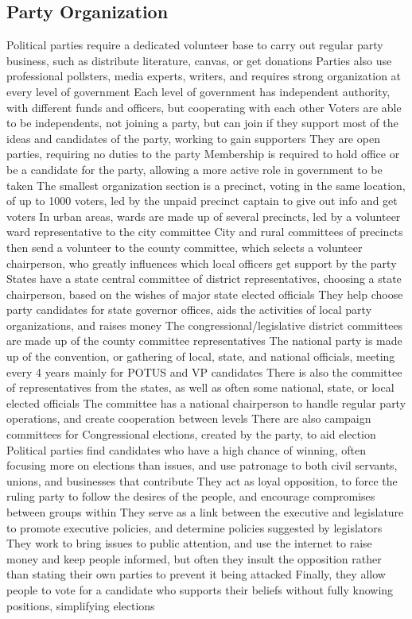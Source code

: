 \documentclass[11 pt, twoside]{article}
\newenvironment{outline*}
{
	\begin{outline}[enumerate]
	}
	{\end{outline}
}
\begin{document}
\subsection{Party Organization}
\begin{outline*}
\1 Political parties require a dedicated volunteer base to carry out regular party business, such as distribute literature, canvas, or get donations
\2 Parties also use professional pollsters, media experts, writers, and requires strong organization at every level of government
\2 Each level of government has independent authority, with different funds and officers, but cooperating with each other
\1 Voters are able to be independents, not joining a party, but can join if they support most of the ideas and candidates of the party, working to gain supporters
\2 They are open parties, requiring no duties to the party
\2 Membership is required to hold office or be a candidate for the party, allowing a more active role in government to be taken
\1 The smallest organization section is a precinct, voting in the same location, of up to 1000 voters, led by the unpaid precinct captain to give out info and get voters
\2 In urban areas, wards are made up of several precincts, led by a volunteer ward representative to the city committee
\2 City and rural committees of precincts then send a volunteer to the county committee, which selects a volunteer chairperson, who greatly influences which local officers get support by the party
\1 States have a state central committee of district representatives, choosing a state chairperson, based on the wishes of major state elected officials
\2 They help choose party candidates for state governor offices, aids the activities of local party organizations, and raises money
\2 The congressional/legislative district committees are made up of the county committee representatives
\1 The national party is made up of the convention, or gathering of local, state, and national officials, meeting every 4 years mainly for POTUS and VP candidates
\2 There is also the committee of representatives from the states, as well as often some national, state, or local elected officials
\2 The committee has a national chairperson to handle regular party operations, and create cooperation between levels
\2 There are also campaign committees for Congressional elections, created by the party, to aid election
\1 Political parties find candidates who have a high chance of winning, often focusing more on elections than issues, and use patronage to both civil servants, unions, and businesses that contribute
\2 They act as loyal opposition, to force the ruling party to follow the desires of the people, and encourage compromises between groups within
\2 They serve as a link between the executive and legislature to promote executive policies, and determine policies suggested by legislators
\2 They work to bring issues to public attention, and use the internet to raise money and keep people informed, but often they insult the opposition rather than stating their own parties to prevent it being attacked
\2 Finally, they allow people to vote for a candidate who supports their beliefs without fully knowing positions, simplifying elections
\end{outline*}
\end{document}
